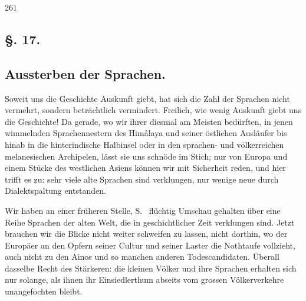 { {\textbar}{\textbar}261{\textbar}{\textbar}\label{sp.261} 

\subsection*{§. 17.}\label{III.II.II.17}
\subsection*{Aussterben der Sprachen.}
Soweit uns die Geschichte Auskunft giebt, hat sich die Zahl der Sprachen nicht vermehrt, sondern beträchtlich vermindert. Freilich, wie wenig Auskunft giebt uns die Geschichte! Da gerade, wo wir ihrer diesmal am Meisten bedürften, in jenen wimmelnden Sprachennestern des Himâlaya und seiner östlichen Ausläufer bis hinab in die hinterindische Halbinsel oder in den sprachen- und völkerreichen melanesischen Archipelen, lässt sie uns schnöde im Stich; nur von Europa und einem Stücke \label{fp.256} des westlichen Asiens können wir mit Sicherheit reden, und hier trifft es zu: sehr viele alte Sprachen sind verklungen, nur wenige neue durch Dialektspaltung entstanden.

Wir haben an einer früheren Stelle, S.~ flüchtig Umschau gehalten über eine Reihe Sprachen der alten Welt, die in geschichtlicher Zeit verklungen sind. Jetzt brauchen wir die Blicke nicht weiter schweifen zu lassen, nicht dorthin, wo der Europäer an den Opfern seiner Cultur und seiner Laster die Nothtaufe vollzieht, auch nicht zu den Ainos und so manchen anderen Todescandidaten. Überall dasselbe Recht des Stärkeren: die kleinen Völker und ihre Sprachen erhalten sich nur solange, als ihnen ihr Einsiedlerthum abseits vom grossen Völkerverkehre unangefochten bleibt.

}
